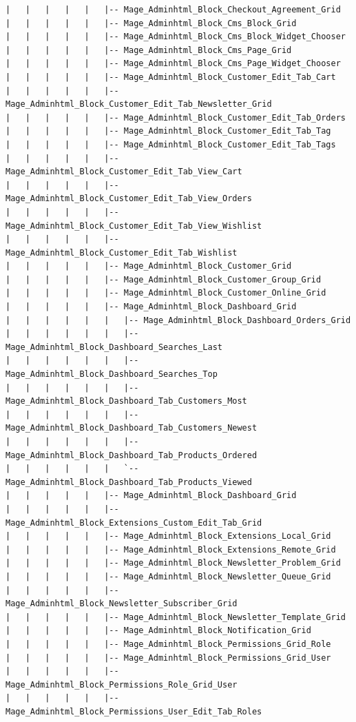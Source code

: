 \documentclass[oneside]{book}
\begin{document}
\begin{lstlisting}
|   |   |   |   |   |-- Mage_Adminhtml_Block_Checkout_Agreement_Grid
|   |   |   |   |   |-- Mage_Adminhtml_Block_Cms_Block_Grid
|   |   |   |   |   |-- Mage_Adminhtml_Block_Cms_Block_Widget_Chooser
|   |   |   |   |   |-- Mage_Adminhtml_Block_Cms_Page_Grid
|   |   |   |   |   |-- Mage_Adminhtml_Block_Cms_Page_Widget_Chooser
|   |   |   |   |   |-- Mage_Adminhtml_Block_Customer_Edit_Tab_Cart
|   |   |   |   |   |-- Mage_Adminhtml_Block_Customer_Edit_Tab_Newsletter_Grid
|   |   |   |   |   |-- Mage_Adminhtml_Block_Customer_Edit_Tab_Orders
|   |   |   |   |   |-- Mage_Adminhtml_Block_Customer_Edit_Tab_Tag
|   |   |   |   |   |-- Mage_Adminhtml_Block_Customer_Edit_Tab_Tags
|   |   |   |   |   |-- Mage_Adminhtml_Block_Customer_Edit_Tab_View_Cart
|   |   |   |   |   |-- Mage_Adminhtml_Block_Customer_Edit_Tab_View_Orders
|   |   |   |   |   |-- Mage_Adminhtml_Block_Customer_Edit_Tab_View_Wishlist
|   |   |   |   |   |-- Mage_Adminhtml_Block_Customer_Edit_Tab_Wishlist
|   |   |   |   |   |-- Mage_Adminhtml_Block_Customer_Grid
|   |   |   |   |   |-- Mage_Adminhtml_Block_Customer_Group_Grid
|   |   |   |   |   |-- Mage_Adminhtml_Block_Customer_Online_Grid
|   |   |   |   |   |-- Mage_Adminhtml_Block_Dashboard_Grid
|   |   |   |   |   |   |-- Mage_Adminhtml_Block_Dashboard_Orders_Grid
|   |   |   |   |   |   |-- Mage_Adminhtml_Block_Dashboard_Searches_Last
|   |   |   |   |   |   |-- Mage_Adminhtml_Block_Dashboard_Searches_Top
|   |   |   |   |   |   |-- Mage_Adminhtml_Block_Dashboard_Tab_Customers_Most
|   |   |   |   |   |   |-- Mage_Adminhtml_Block_Dashboard_Tab_Customers_Newest
|   |   |   |   |   |   |-- Mage_Adminhtml_Block_Dashboard_Tab_Products_Ordered
|   |   |   |   |   |   `-- Mage_Adminhtml_Block_Dashboard_Tab_Products_Viewed
|   |   |   |   |   |-- Mage_Adminhtml_Block_Dashboard_Grid
|   |   |   |   |   |-- Mage_Adminhtml_Block_Extensions_Custom_Edit_Tab_Grid
|   |   |   |   |   |-- Mage_Adminhtml_Block_Extensions_Local_Grid
|   |   |   |   |   |-- Mage_Adminhtml_Block_Extensions_Remote_Grid
|   |   |   |   |   |-- Mage_Adminhtml_Block_Newsletter_Problem_Grid
|   |   |   |   |   |-- Mage_Adminhtml_Block_Newsletter_Queue_Grid
|   |   |   |   |   |-- Mage_Adminhtml_Block_Newsletter_Subscriber_Grid
|   |   |   |   |   |-- Mage_Adminhtml_Block_Newsletter_Template_Grid
|   |   |   |   |   |-- Mage_Adminhtml_Block_Notification_Grid
|   |   |   |   |   |-- Mage_Adminhtml_Block_Permissions_Grid_Role
|   |   |   |   |   |-- Mage_Adminhtml_Block_Permissions_Grid_User
|   |   |   |   |   |-- Mage_Adminhtml_Block_Permissions_Role_Grid_User
|   |   |   |   |   |-- Mage_Adminhtml_Block_Permissions_User_Edit_Tab_Roles

\end{lstlisting}
\end{document}

